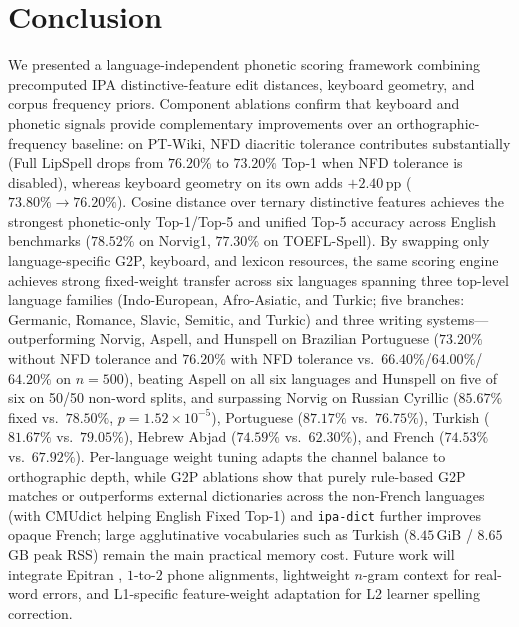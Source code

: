 \documentclass[11pt,a4paper]{article}
\begin{document}
\section{Conclusion}
\label{sec:conclusion}
We presented a language-independent phonetic scoring framework combining precomputed IPA distinctive-feature edit distances, keyboard geometry, and corpus frequency priors. Component ablations confirm that keyboard and phonetic signals provide complementary improvements over an orthographic-frequency baseline: on PT-Wiki, NFD diacritic tolerance contributes substantially (Full LipSpell drops from $76.20\%$ to $73.20\%$ Top-1 when NFD tolerance is disabled), whereas keyboard geometry on its own adds $+2.40$\,pp ($73.80\% \rightarrow 76.20\%$). Cosine distance over ternary distinctive features achieves the strongest phonetic-only Top-1/Top-5 and unified Top-5 accuracy across English benchmarks ($78.52\%$ on Norvig1, $77.30\%$ on TOEFL-Spell). By swapping only language-specific G2P, keyboard, and lexicon resources, the same scoring engine achieves strong fixed-weight transfer across six languages spanning three top-level language families (Indo-European, Afro-Asiatic, and Turkic; five branches: Germanic, Romance, Slavic, Semitic, and Turkic) and three writing systems---outperforming Norvig, Aspell, and Hunspell on Brazilian Portuguese ($73.20\%$ without NFD tolerance and $76.20\%$ with NFD tolerance vs.\ $66.40\%$/$64.00\%$/$64.20\%$ on $n=500$), beating Aspell on all six languages and Hunspell on five of six on 50/50 non-word splits, and surpassing Norvig on Russian Cyrillic ($85.67\%$ fixed vs.\ $78.50\%$, $p=1.52\times 10^{-5}$), Portuguese ($87.17\%$ vs.\ $76.75\%$), Turkish ($81.67\%$ vs.\ $79.05\%$), Hebrew Abjad ($74.59\%$ vs.\ $62.30\%$), and French ($74.53\%$ vs.\ $67.92\%$). Per-language weight tuning adapts the channel balance to orthographic depth, while G2P ablations show that purely rule-based G2P matches or outperforms external dictionaries across the non-French languages (with CMUdict helping English Fixed Top-1) and \texttt{ipa-dict} further improves opaque French; large agglutinative vocabularies such as Turkish ($8.45$\,GiB / $8.65$\,GB peak RSS) remain the main practical memory cost. Future work will integrate Epitran \citep{mortensen2018epitran}, $1$-to-$2$ phone alignments, lightweight $n$-gram context for real-word errors, and L1-specific feature-weight adaptation for L2 learner spelling correction.




\appendix
\end{document}
